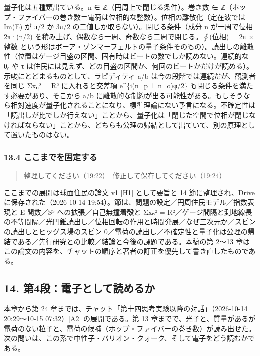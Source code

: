 \documentclass[
  a4paper,
]{ltjsarticle}
\begin{document}
量子化は五種類出ている。n ∈ ℤ（円周上で閉じる条件）。巻き数 ∈
ℤ（ホップ・ファイバーの巻き数＝電荷は位相的な整数）。位相の離散化（定在波では
Im(E) が π/2 か 3π/2 の二値しか取らない）。閉じる条件（成分 n
が一周で位相 2π·(n/2)
を積み上げ、偶数なら一周、奇数なら二周で閉じる。\(\oint\)(位相) = 2π ×
整数
という形はボーア・ゾンマーフェルトの量子条件そのもの）。読出しの離散性（位置はゲージ目盛の区間、固有時はビートの数でしか読めない。連続的な
θ₀ や τ
は住民には見えず、どの目盛の区間か、何回のビートかだけが読める）。示唆にとどまるものとして、ラピディティ
a/b は今の段階では連続だが、観測者を同じ Σxₙ² = R² に入れると交差項
e\^{}\{i(n\_p ± n\_o)φ/2\} も閉じる条件を満たす必要があり、そこから a/b
に離散的な制約が出る可能性がある。もしそうなら相対速度が量子化されることになり、標準理論にない予言になる。不確定性は「読出しが比でしか行えない」ことから、量子化は「閉じた空間で位相が閉じなければならない」ことから、どちらも公理の帰結として出ていて、別の原理として置いたものはない。

\subsubsection{13.4
ここまでを固定する}\label{ux3053ux3053ux307eux3067ux3092ux56faux5b9aux3059ux308b}

\begin{quote}
整理してください（19:22）　修正して保存してください（19:24）
\end{quote}

ここまでの展開は球面住民の論文 v1 {[}H1{]} として要旨と 14
節に整理され、Drive に保存された（2026-10-14
19:54）。節は、問題の設定／円周住民モデル／指数表現と E 関数／S³
への拡張／自己無撞着殻と Σxₙ² =
R²／ゲージ間隔と測地線長の不等間隔／光円錐読出し／位相回転の作用と時間発展／なぜ三次元か／スピンの読出しとヒッグス場のスピン
0／電荷の読出し／不確定性と量子化は公理の帰結である／先行研究との比較／結論と今後の課題である。本稿の第
2〜13
章はこの論文の内容を、チャットの順序と著者の訂正を優先して書き直したものである。

\subsection{14.
第4段：電子として読めるか}\label{ux7b2c4ux6bb5ux96fbux5b50ux3068ux3057ux3066ux8aadux3081ux308bux304b}

本章から第 24 章までは、チャット「第十四思考実験以降の対話」（2026-10-14
20:29〜10-15 07:32）{[}A2{]} の展開である。第 13
章までで、光子と、質量があるが電荷のない粒子と、電荷の候補（ホップ・ファイバーの巻き数）が読み出せた。次の問いは、この系で中性子・バリオン・クォーク、そして電子をどう読むかである。
\end{document}
